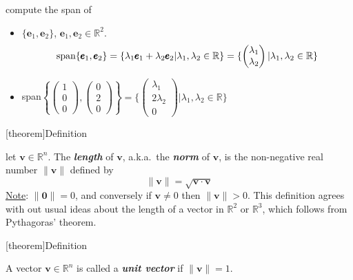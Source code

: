 \documentclass[12pt]{report}
\theoremstyle{definition}
\begin{document}
\begin{ex}
    compute the span of 
    \begin{itemize}
        \item $\{\pmb{e}_1, \pmb{e}_2\}$, $\pmb{e}_1, \pmb{e}_2 \in \mathbb{R}^2$.
            \[
                \textnormal{span}\{\pmb{e}_1, \pmb{e}_2\} 
                = \{\lambda_1 \pmb{e}_1 + \lambda_2 \pmb{e}_2 | \lambda_1, \lambda_2 \in \mathbb{R}\}
            = \{
                    \begin{pmatrix}
                            \lambda_1\\
                            \lambda_2
                    \end{pmatrix}
| \lambda_1, \lambda_2 \in\mathbb{R}\}\]

\item span$\left\{\begin{pmatrix}
        1\\
        0\\
        0
\end{pmatrix}
, \begin{pmatrix}
        0\\
        2\\
        0
\end{pmatrix}
\right\} = \{
\begin{pmatrix}
        \lambda_1\\
        2\lambda_2\\
        0
\end{pmatrix}
| \lambda_1, \lambda_2 \in \mathbb{R}
\}$
    \end{itemize}
    
\end{ex}

[theorem]{Definition}
\begin{length and norm}
    let $\pmb{v} \in \mathbb{R}^{n}$. The \textbf{\emph{length}} of $\pmb{v}$, a.k.a.\ the \textbf{\emph{norm}} 
    of $\pmb{v}$, is the non-negative real number $\lVert\pmb{v}\rVert$ defined by \[
        \lVert\pmb{v}\rVert = \sqrt{\pmb{v} \cdot \pmb{v}}
    \]
    \underline{Note}: $\lVert\pmb{0}\rVert = 0$, and conversely if $\pmb{v} \neq 0$ then $\lVert\pmb{v}\rVert > 0$.
    This definition agrees with out usual ideas about the length of a vector in $\mathbb{R}^{2}$
    or $\mathbb{R}^{3}$, which follows from Pythagoras' theorem.
\end{length and norm}

[theorem]{Definition}
\begin{unit vector}
    A vector $\pmb{v} \in \mathbb{R}^{n}$ is called a \textbf{\emph{unit vector}}
    if $\lVert\pmb{v}\rVert = 1$.
\end{unit vector}
\end{document}
